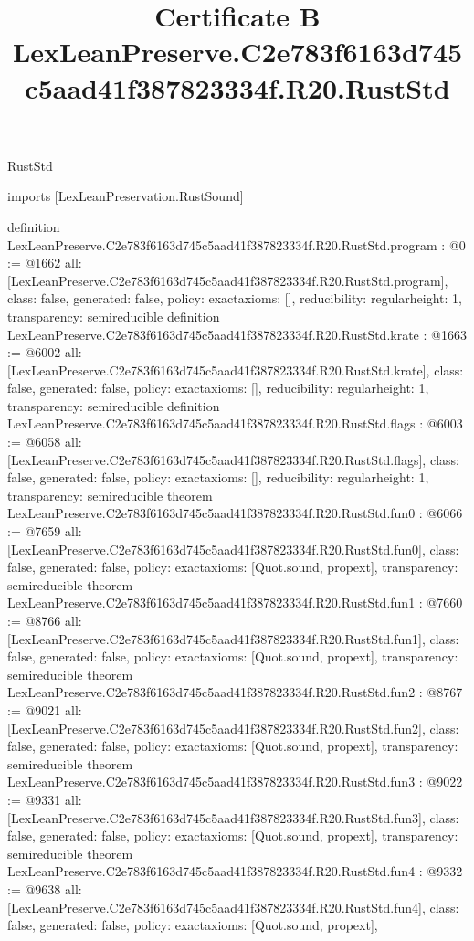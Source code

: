 \begin{lexlean}{RustStd}
\title{Certificate B LexLeanPreserve.C2e783f6163d745c5aad41f387823334f.R20.RustStd}
\begin{coremodule}
imports [LexLeanPreservation.RustSound]

definition LexLeanPreserve.C2e783f6163d745c5aad41f387823334f.R20.RustStd.program : @0 := @1662 {
  all: [LexLeanPreserve.C2e783f6163d745c5aad41f387823334f.R20.RustStd.program],
  class: false,
  generated: false,
  policy: exact{axioms: []},
  reducibility: regular{height: 1},
  transparency: semireducible
}
definition LexLeanPreserve.C2e783f6163d745c5aad41f387823334f.R20.RustStd.krate : @1663 := @6002 {
  all: [LexLeanPreserve.C2e783f6163d745c5aad41f387823334f.R20.RustStd.krate],
  class: false,
  generated: false,
  policy: exact{axioms: []},
  reducibility: regular{height: 1},
  transparency: semireducible
}
definition LexLeanPreserve.C2e783f6163d745c5aad41f387823334f.R20.RustStd.flags : @6003 := @6058 {
  all: [LexLeanPreserve.C2e783f6163d745c5aad41f387823334f.R20.RustStd.flags],
  class: false,
  generated: false,
  policy: exact{axioms: []},
  reducibility: regular{height: 1},
  transparency: semireducible
}
theorem LexLeanPreserve.C2e783f6163d745c5aad41f387823334f.R20.RustStd.fun0 : @6066 := @7659 {
  all: [LexLeanPreserve.C2e783f6163d745c5aad41f387823334f.R20.RustStd.fun0],
  class: false,
  generated: false,
  policy: exact{axioms: [Quot.sound, propext]},
  transparency: semireducible
}
theorem LexLeanPreserve.C2e783f6163d745c5aad41f387823334f.R20.RustStd.fun1 : @7660 := @8766 {
  all: [LexLeanPreserve.C2e783f6163d745c5aad41f387823334f.R20.RustStd.fun1],
  class: false,
  generated: false,
  policy: exact{axioms: [Quot.sound, propext]},
  transparency: semireducible
}
theorem LexLeanPreserve.C2e783f6163d745c5aad41f387823334f.R20.RustStd.fun2 : @8767 := @9021 {
  all: [LexLeanPreserve.C2e783f6163d745c5aad41f387823334f.R20.RustStd.fun2],
  class: false,
  generated: false,
  policy: exact{axioms: [Quot.sound, propext]},
  transparency: semireducible
}
theorem LexLeanPreserve.C2e783f6163d745c5aad41f387823334f.R20.RustStd.fun3 : @9022 := @9331 {
  all: [LexLeanPreserve.C2e783f6163d745c5aad41f387823334f.R20.RustStd.fun3],
  class: false,
  generated: false,
  policy: exact{axioms: [Quot.sound, propext]},
  transparency: semireducible
}
theorem LexLeanPreserve.C2e783f6163d745c5aad41f387823334f.R20.RustStd.fun4 : @9332 := @9638 {
  all: [LexLeanPreserve.C2e783f6163d745c5aad41f387823334f.R20.RustStd.fun4],
  class: false,
  generated: false,
  policy: exact{axioms: [Quot.sound, propext]},
}
\end{coremodule}
\end{lexlean}

